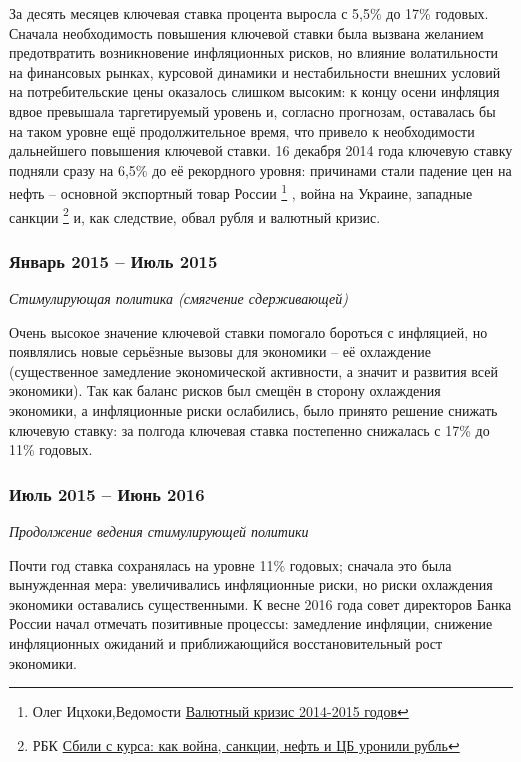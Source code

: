\noindent
За десять месяцев ключевая ставка процента выросла с 5,5\% до 17\% годовых. Сначала необходимость повышения ключевой ставки была вызвана желанием предотвратить возникновение инфляционных рисков, но влияние волатильности на финансовых рынках, курсовой динамики и нестабильности внешних условий на потребительские цены оказалось слишком высоким: к концу осени инфляция вдвое превышала таргетируемый уровень и, согласно прогнозам, оставалась бы на таком уровне ещё продолжительное время, что привело к необходимости дальнейшего повышения ключевой ставки. 16 декабря 2014 года ключевую ставку подняли сразу на 6,5\% до её рекордного уровня: причинами стали падение цен на нефть – основной экспортный товар России \footnote{Олег Ицхоки,Ведомости \href{https://www.vedomosti.ru/opinion/articles/2015/01/12/valyutnyj-krizis-20142015-gg}{Валютный кризис 2014-2015 годов}} \cite{CurrencyCrisis}, война на Украине, западные санкции \footnote{РБК  \href{https://www.rbc.ru/economics/09/02/2015/54d7cccf9a79471f9f83f9dd}{Сбили с курса: как война, санкции, нефть и ЦБ уронили рубль}} \cite{War} и, как следствие, обвал рубля и валютный кризис.

\subsubsection*{Январь 2015 – Июль 2015}
\noindent
\emph{Стимулирующая политика (смягчение сдерживающей)}

\noindent
Очень высокое значение ключевой ставки помогало бороться с инфляцией, но появлялись новые серьёзные вызовы для экономики – её охлаждение (существенное замедление экономической активности, а значит и развития всей экономики). Так как баланс рисков был смещён в сторону охлаждения экономики, а инфляционные риски ослабились, было принято решение снижать ключевую ставку: за полгода ключевая ставка постепенно снижалась с 17\% до 11\% годовых.

\subsubsection*{Июль 2015 – Июнь 2016}
\noindent
\emph{Продолжение ведения стимулирующей политики}

\noindent
Почти год ставка сохранялась на уровне 11\% годовых; сначала это была вынужденная мера: увеличивались инфляционные риски, но риски охлаждения экономики оставались существенными. К весне 2016 года совет директоров Банка России начал отмечать позитивные процессы: замедление инфляции, снижение инфляционных ожиданий и приближающийся восстановительный рост экономики.

